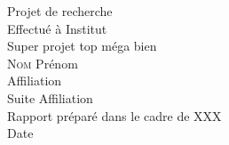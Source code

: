 \documentclass[a4paper,11pt]{article}
\title{}
\author{}
\begin{document}

\thispagestyle{empty}

\begin{center}

        \makebox[\textwidth][l]{
        }

        \makebox[\textwidth][r]{
			\raisebox{30pt}[0pt][0pt]{
			}
        }

        \vspace{3cm}
        {\huge Projet de recherche}\\
        \vspace{0.5cm}
        {\large Effectu\'e \`a Institut}\\
        \vspace{3cm}
        {\Huge Super projet top méga bien}\\

        \vspace{3.5cm}
        {\large N{\textsc {om}} Prénom}\\
        {\large Affiliation}\\
        {\large Suite Affiliation}\\

        \vspace{4cm}
        Rapport préparé dans le cadre de XXX\\
        Date\\

\end{center}

\clearpage
\end{document}

